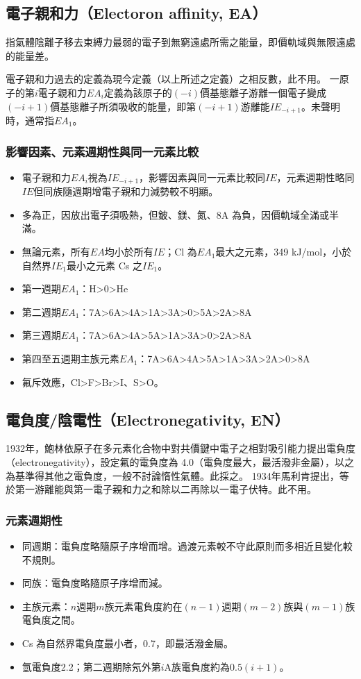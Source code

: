 \documentclass[a4paper,12pt]{report}
\begin{document}
\subsection{電子親和力（Electoron affinity, EA）}
\bctf{}\efct
{}
指氣體陰離子移去束縛力最弱的電子到無窮遠處所需之能量，即價軌域與無限遠處的能量差。

電子親和力過去的定義為現今定義（以上所述之定義）之相反數，此不用。
一原子的第$i$電子親和力$EA_i$定義為該原子的$(-i)$價基態離子游離一個電子變成$(-i+1)$價基態離子所須吸收的能量，即第$(-i+1)$游離能$IE_{-i+1}$。未聲明時，通常指$EA_1$。
\subsubsection{影響因素、元素週期性與同一元素比較}
\begin{itemize}
\item 電子親和力$EA_i$視為$IE_{-i+1}$，影響因素與同一元素比較同$IE$，元素週期性略同$IE$但同族隨週期增電子親和力減勢較不明顯。
\item 多為正，因放出電子須吸熱，但鈹、鎂、氮、8A 為負，因價軌域全滿或半滿。
\item 無論元素，所有$EA$均小於所有$IE$；Cl 為$EA_1$最大之元素，349 kJ/mol，小於自然界$IE_1$最小之元素 Cs 之$IE_1$。
\item 第一週期$EA_1$：H>0>He
\item 第二週期$EA_1$：7A>6A>4A>1A>3A>0>5A>2A>8A
\item 第三週期$EA_1$：7A>6A>4A>5A>1A>3A>0>2A>8A
\item 第四至五週期主族元素$EA_1$：7A>6A>4A>5A>1A>3A>2A>0>8A
\item 氟斥效應，Cl>F>Br>I、S>O。
\end{itemize}
\subsection{電負度/陰電性（Electronegativity, EN）}
\bctf{}\efct
{}
1932年，鮑林依原子在多元素化合物中對共價鍵中電子之相對吸引能力提出電負度（electronegativity），設定氟的電負度為 4.0（電負度最大，最活潑非金屬），以之為基準得其他之電負度，一般不討論惰性氣體。此採之。
1934年馬利肯提出，等於第一游離能與第一電子親和力之和除以二再除以一電子伏特。此不用。
\subsubsection{元素週期性}
\begin{itemize}
\item 同週期：電負度略隨原子序增而增。過渡元素較不守此原則而多相近且變化較不規則。
\item 同族：電負度略隨原子序增而減。
\item 主族元素：$n$週期$m$族元素電負度約在$(n-1)$週期$(m-2)$族與$(m-1)$族電負度之間。
\item Cs 為自然界電負度最小者，0.7，即最活潑金屬。
\item 氫電負度2.2；第二週期除氖外第$i$A族電負度約為$0.5(i+1)$。
\end{itemize}
\end{document}
